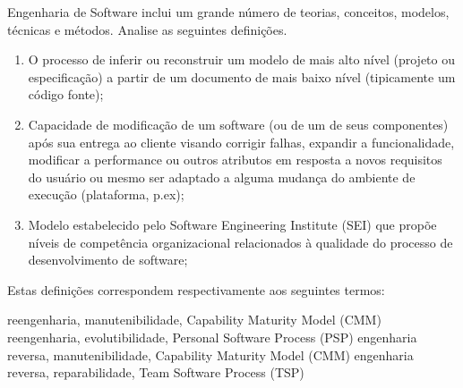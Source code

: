 \documentclass[12pt, addpoints]{exam}
\begin{document}
\begin{questions}
\question

Engenharia de Software inclui um grande número de teorias, conceitos, modelos, técnicas e métodos. Analise as seguintes definições.

\begin{enumerate}[label=\Roman*.]

    \item O processo de inferir ou reconstruir um modelo de mais alto nível (projeto ou especificação) a partir de um documento de mais baixo nível (tipicamente um código fonte);

    \item Capacidade de modificação de um software (ou de um de seus componentes) após sua entrega ao cliente visando corrigir falhas, expandir a funcionalidade, modificar a performance ou outros atributos em resposta a novos requisitos do usuário ou mesmo ser adaptado a alguma mudança do ambiente de execução (plataforma, p.ex);

    \item Modelo estabelecido pelo Software Engineering Institute (SEI) que propõe níveis de competência organizacional relacionados à qualidade do processo de desenvolvimento de software;

\end{enumerate}

Estas definições correspondem respectivamente aos seguintes termos:
\begin{choices}
\choice reengenharia, manutenibilidade, Capability Maturity Model (CMM)
\choice reengenharia, evolutibilidade, Personal Software Process (PSP)
\choice engenharia reversa, manutenibilidade, Capability Maturity Model (CMM)
\choice engenharia reversa, reparabilidade, Team Software Process (TSP)
\end{choices}



    \end{questions}
    
\end{document}
